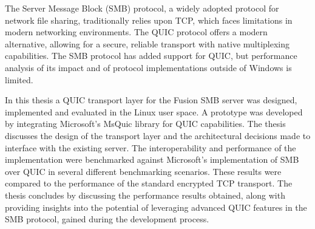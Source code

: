 \documentclass[english, 12pt, a4paper, elec, utf8, a-2b, online]{aaltothesis}
\date{24 November 2025}
\begin{document}
\makecoverpage

\makecopyrightpage

\clearpage

\begin{abstractpage}[english]
	The Server Message Block (SMB) protocol, a widely adopted protocol for network
	file sharing, traditionally relies upon TCP, which faces limitations in modern
	networking environments. The QUIC protocol offers a modern alternative, allowing
	for a secure, reliable transport with native multiplexing capabilities. The SMB
	protocol has added support for QUIC, but performance analysis of its impact and
	of protocol implementations outside of Windows is limited.

	In this thesis a QUIC transport layer for the Fusion SMB server was designed,
	implemented and evaluated in the Linux user space. A prototype was
	developed by integrating Microsoft's MsQuic library for QUIC capabilities. The
	thesis discusses the design of the transport layer and the architectural decisions
	made to interface with the existing server. The interoperability and performance of
	the implementation were benchmarked against
    Microsoft's implementation of SMB over QUIC in several different
	benchmarking scenarios. These results were compared to the performance of the standard
	encrypted TCP transport. The thesis concludes by discussing the performance
	results obtained, along with providing insights into the potential of leveraging
	advanced QUIC features in the SMB protocol, gained during the development process.
\end{abstractpage}

\end{document}
